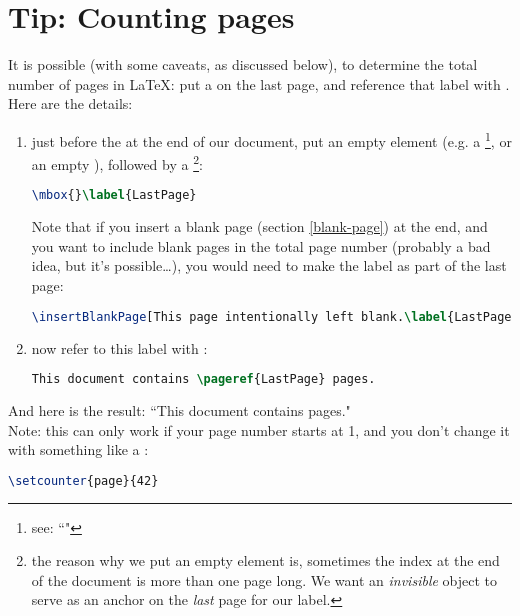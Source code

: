 \section{Tip: Counting pages}

It is possible (with some caveats, as discussed below), to determine the total number of pages in \LaTeX: put a  on the last page, and reference that label with . \\

Here are the details:

\begin{enumerate}
	\item just before the
	\lstinline||
	at the end of our document, put an empty element (e.g. a \footnote{see: ``"}, or an empty ), followed by a  \footnote{
the reason why we put an empty element is, sometimes the index at the end of the document is more than one page long. We want an \emph{invisible} object to serve as an anchor on the \emph{last} page for our label.
}:
\begin{lstlisting}[language=tex]
\mbox{}\label{LastPage}

\end{lstlisting}

Note that if you insert a blank page (section \ref{blank-page}) at the end, and you want to include blank pages in the total page number (probably a bad idea, but it's possible\dots), you would need to make the label as part of the last page:
\begin{lstlisting}[language=tex]
\insertBlankPage[This page intentionally left blank.\label{LastPage}]

\end{lstlisting}
	
	\item now refer to this label with  :
\begin{lstlisting}[language=tex]
This document contains \pageref{LastPage} pages.
\end{lstlisting}


\end{enumerate}

And here is the result: ``This document contains \pageref{LastPage} pages." \\


Note: this can only work if your page number starts at 1, and you don't change it with something like a :
\begin{lstlisting}[language=tex]
\setcounter{page}{42}
\end{lstlisting} 


